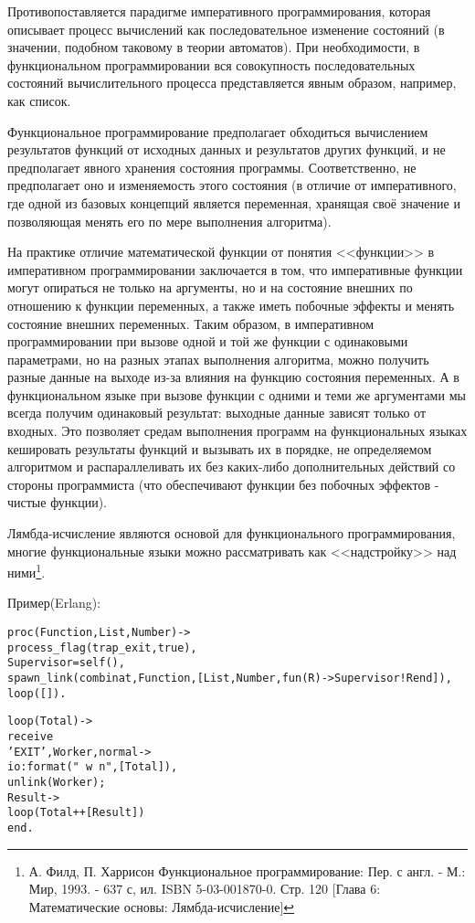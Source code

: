 \documentclass[12pt, twoside]{report}
\begin{document}
Противопоставляется парадигме императивного программирования, которая описывает процесс вычислений как последовательное изменение состояний (в значении, подобном таковому в теории автоматов). При необходимости, в функциональном программировании вся совокупность последовательных состояний вычислительного процесса представляется явным образом, например, как список.

Функциональное программирование предполагает обходиться вычислением результатов функций от исходных данных и результатов других функций, и не предполагает явного хранения состояния программы. Соответственно, не предполагает оно и изменяемость этого состояния (в отличие от императивного, где одной из базовых концепций является переменная, хранящая своё значение и позволяющая менять его по мере выполнения алгоритма).

На практике отличие математической функции от понятия <<функции>> в императивном программировании заключается в том, что императивные функции могут опираться не только на аргументы, но и на состояние внешних по отношению к функции переменных, а также иметь побочные эффекты и менять состояние внешних переменных. Таким образом, в императивном программировании при вызове одной и той же функции с одинаковыми параметрами, но на разных этапах выполнения алгоритма, можно получить разные данные на выходе из-за влияния на функцию состояния переменных. А в функциональном языке при вызове функции с одними и теми же аргументами мы всегда получим одинаковый результат: выходные данные зависят только от входных. Это позволяет средам выполнения программ на функциональных языках кешировать результаты функций и вызывать их в порядке, не определяемом алгоритмом и распараллеливать их без каких-либо дополнительных действий со стороны программиста (что обеспечивают функции без побочных эффектов - чистые функции).

Лямбда-исчисление являются основой для функционального программирования, многие функциональные языки можно рассматривать как <<надстройку>> над ними\footnote{А. Филд, П. Харрисон Функциональное программирование: Пер. с англ. - М.: Мир, 1993. - 637 с, ил. ISBN 5-03-001870-0. Стр. 120 [Глава 6: Математические основы: Лямбда-исчисление]}.

Пример(Erlang):
\begin{alltt}
proc(Function, List, Number) ->
    process_flag(trap_exit, true),
    Supervisor = self(),
    spawn_link(combinat, Function, [List, Number, fun(R)->Supervisor!R end]),
    loop([]).

loop(Total) ->
    receive
    {'EXIT', Worker, normal} ->
        io:format("~w~n", [Total]),
        unlink(Worker);
    Result ->
        loop(Total ++ [Result])
    end.
\end{alltt}
\end{document}
